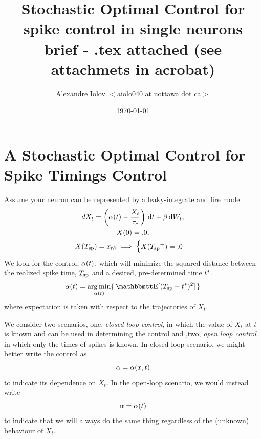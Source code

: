 \documentclass{article}
\begin{document}
\title{Stochastic Optimal Control for spike control in single neurons
\\
\vskip3pt
brief - .tex attached (see attachmets in acrobat)
}
\author{Alexandre Iolov 
$<$\href{mailto:aiolo040@uottawa.ca}
		{aiolo040 at uottawa dot ca}$>$}

\date{\today}

\maketitle


\section{A Stochastic Optimal Control for Spike Timings Control}
Assume your neuron can be represented by a leaky-integrate and fire model
\begin{equation}
\begin{gathered} 
dX_t = \left({\alpha}(t) - \frac{X_t}{{ \tau_{c} }} \right) \, \mathrm{d} t + {\beta} \, \mathrm{d} W_t,
\\
X(0) = .0,
\\
X({ T_{\textrm{sp} } }) = { x_{th} } \implies  
\begin{cases}
X({ T_{\textrm{sp} } }^+) = .0 &  
\end{cases}
\end{gathered}
\label{eq:X_evolution_uo}
\end{equation}
We look for the control, ${\alpha}(t)$, which will minimize the squared distance
between the realized spike time, ${ T_{\textrm{sp} } }$ and a desired, pre-determined time ${ t^* }$.
\begin{equation}
\a(t) = \argmin_{\a(t)} \{\, \Exp[(\ts- \T)^2] \,\}
\label{eq:OC_LS_variance}   
\end{equation}
where expectation is taken with respect to the trajectories of $X_t$.

We consider two scenarios, one, {\sl closed loop control}, in which the
value of $X_t$ at $t$ is known and can be used in determining the control and
,two, {\sl open loop control} in which only the times of spikes is known. In
closed-loop scenario, we might better write the control as
$${\alpha} = {\alpha}(x,t)$$ to indicate its dependence on $X_t$. In the open-loop scenario,
we would instead write $${\alpha} = {\alpha}(t)$$ to indicate that we will always do the
same thing regardless of the (unknown) behaviour of $X_t$. 
\end{document}
